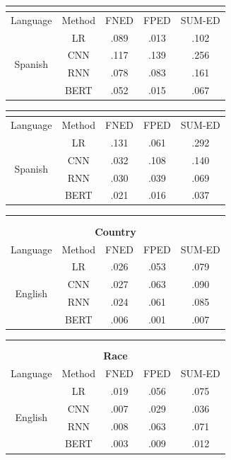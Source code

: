 \begin{table}[htp]
\begin{tabular}{cc|ccc}
\multicolumn{5}{c}{} \\\hline\hline
Language & Method & FNED & FPED & SUM-ED \\\hline
\multirow{4}{*}{Spanish} & LR & .089 & .013 & .102 \\
 & CNN  & .117 & .139 & .256 \\
 & RNN  & .078 & .083 & .161 \\
 & BERT & .052 & .015 & .067
\end{tabular}
\quad
\begin{tabular}{cc|ccc}
\multicolumn{5}{c}{} \\\hline\hline
Language & Method & FNED & FPED & SUM-ED \\\hline
\multirow{4}{*}{Spanish} & LR & .131 & .061 & .292 \\
 & CNN  & .032 & .108 & .140 \\
 & RNN  & .030 & .039 & .069 \\
 & BERT & .021 & .016 & .037
\end{tabular}

\begin{tabular}{cc|ccc}
\multicolumn{5}{c}{} \\
\multicolumn{5}{c}{} \\
\multicolumn{5}{c}{\textbf{Country}} \\\hline\hline
Language & Method & FNED & FPED & SUM-ED \\\hline
\multirow{4}{*}{English} & LR & .026 & .053 & .079 \\
 & CNN  & .027 & .063 & .090\\
 & RNN  & .024 & .061 & .085\\
 & BERT & .006 & .001 & .007
\end{tabular}
\quad
\begin{tabular}{cc|ccc}
\multicolumn{5}{c}{} \\
\multicolumn{5}{c}{} \\
\multicolumn{5}{c}{\textbf{Race}} \\\hline\hline
Language & Method & FNED & FPED & SUM-ED \\\hline
\multirow{4}{*}{English} & LR  & .019 & .056 & .075 \\
 & CNN  & .007 & .029 & .036 \\
 & RNN  & .008 & .063 & .071 \\
 & BERT & .003 & .009 & .012 
\end{tabular}


\end{table}
